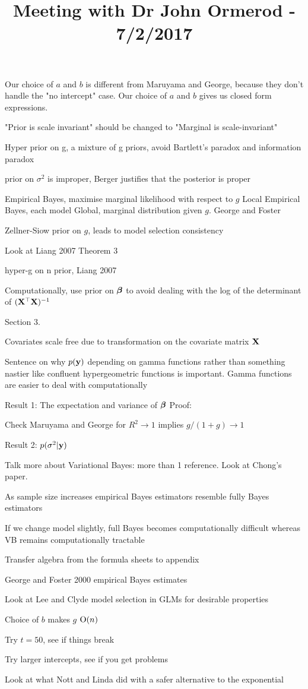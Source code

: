 \documentclass{amsart}
\title{Meeting with Dr John Ormerod - 7/2/2017}
\begin{document}
\maketitle

Our choice of $a$ and $b$ is different from Maruyama and George, because they don't handle the "no intercept"
case. Our choice of $a$ and $b$ gives us closed form expressions.

"Prior is scale invariant" should be changed to "Marginal is scale-invariant"

Hyper prior on g, a mixture of g priors, avoid Bartlett's paradox and information paradox

prior on $\sigma^2$ is improper, Berger justifies that the posterior is proper

Empirical Bayes, maximise marginal likelihood with respect to $g$
	Local Empirical Bayes, each model
	Global, marginal distribution given $g$. George and Foster

Zellner-Siow prior on $g$, leads to model selection consistency

Look at Liang 2007 Theorem 3

hyper-g on n prior, Liang 2007

Computationally, use prior on ${\boldsymbol \beta}$ to avoid dealing with the log of the determinant of
$({\bf X}^\top {\bf X})^{-1}$

Section 3.

Covariates scale free due to transformation on the covariate matrix ${\bf X}$

Sentence on why $p({\bf y})$ depending on gamma functions rather than something nastier like confluent
hypergeometric functions is important. Gamma functions are easier to deal with computationally

Result 1: The expectation and variance of ${\boldsymbol \beta}$
Proof:

Check Maruyama and George for $R^2 \to 1$ implies $g/(1 + g) \to 1$

Result 2: $p(\sigma^2 | {\bf y})$

Talk more about Variational Bayes: more than 1 reference. Look at Chong's paper.

As sample size increases empirical Bayes estimators resemble fully Bayes estimators

If we change model slightly, full Bayes becomes computationally difficult whereas VB remains computationally
tractable

Transfer algebra from the formula sheets to appendix

George and Foster 2000 empirical Bayes estimates

Look at Lee and Clyde model selection in GLMs for desirable properties

Choice of $b$ makes $g$ $\text{O}(n)$

Try $t=50$, see if things break

Try larger intercepts, see if you get problems

Look at what Nott and Linda did with a safer alternative to the exponential
\end{document}
